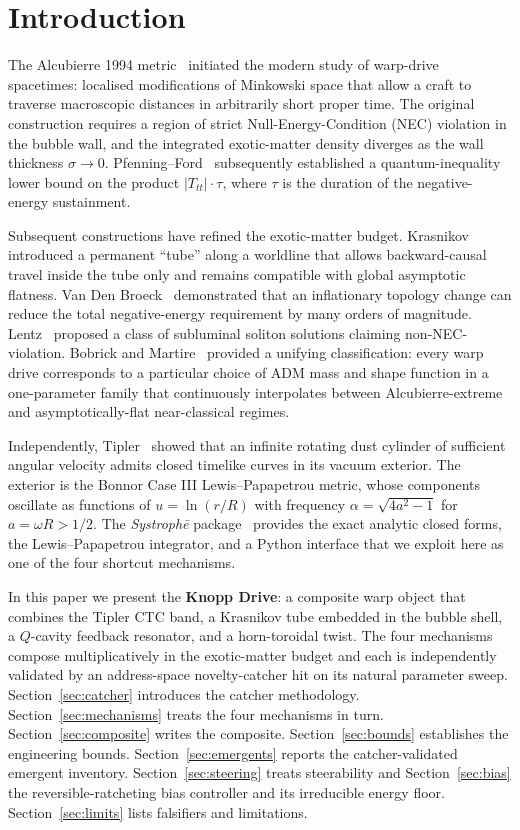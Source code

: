 \documentclass[11pt,a4paper]{article}
\begin{document}
\tableofcontents
\bigskip

\section{Introduction}

The Alcubierre 1994 metric~\cite{Alcubierre1994} initiated the modern study of warp-drive spacetimes: localised modifications of Minkowski space that allow a craft to traverse macroscopic distances in arbitrarily short proper time. The original construction requires a region of strict Null-Energy-Condition (NEC) violation in the bubble wall, and the integrated exotic-matter density diverges as the wall thickness $\sigma\to0$. Pfenning--Ford~\cite{PfenningFord1997} subsequently established a quantum-inequality lower bound on the product $|T_{tt}|\cdot\tau$, where $\tau$ is the duration of the negative-energy sustainment.

Subsequent constructions have refined the exotic-matter budget. Krasnikov~\cite{Krasnikov1995} introduced a permanent ``tube'' along a worldline that allows backward-causal travel inside the tube only and remains compatible with global asymptotic flatness. Van Den Broeck~\cite{VanDenBroeck1999} demonstrated that an inflationary topology change can reduce the total negative-energy requirement by many orders of magnitude. Lentz~\cite{Lentz2021} proposed a class of subluminal soliton solutions claiming non-NEC-violation. Bobrick and Martire~\cite{BobrickMartire2021} provided a unifying classification: every warp drive corresponds to a particular choice of ADM mass and shape function in a one-parameter family that continuously interpolates between Alcubierre-extreme and asymptotically-flat near-classical regimes.

Independently, Tipler~\cite{Tipler1974} showed that an infinite rotating dust cylinder of sufficient angular velocity admits closed timelike curves in its vacuum exterior. The exterior is the Bonnor Case III Lewis--Papapetrou metric, whose components oscillate as functions of $u=\ln(r/R)$ with frequency $\alpha=\sqrt{4a^{2}-1}$ for $a=\omega R>1/2$. The \emph{Systroph\=e} package~\cite{SystropheRepo} provides the exact analytic closed forms, the Lewis--Papapetrou integrator, and a Python interface that we exploit here as one of the four shortcut mechanisms.

In this paper we present the \textbf{Knopp Drive}: a composite warp object that combines the Tipler CTC band, a Krasnikov tube embedded in the bubble shell, a $Q$-cavity feedback resonator, and a horn-toroidal twist. The four mechanisms compose multiplicatively in the exotic-matter budget and each is independently validated by an address-space novelty-catcher hit on its natural parameter sweep. Section~\ref{sec:catcher} introduces the catcher methodology. Section~\ref{sec:mechanisms} treats the four mechanisms in turn. Section~\ref{sec:composite} writes the composite. Section~\ref{sec:bounds} establishes the engineering bounds. Section~\ref{sec:emergents} reports the catcher-validated emergent inventory. Section~\ref{sec:steering} treats steerability and Section~\ref{sec:bias} the reversible-ratcheting bias controller and its irreducible energy floor. Section~\ref{sec:limits} lists falsifiers and limitations.
\end{document}
